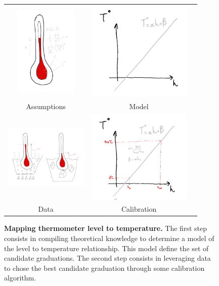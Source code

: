 \begin{bibunit}
\begin{figure}[h]
\begin{tabular}{ccc}
    \includegraphics[clip, width=3cm, width=3cm]{Introduction/pics/therm_theroy.png} &   \includegraphics[clip, width=5cm]{Introduction/pics/therm_model.png}  &   \\   Assumptions & Model&\\ 
     \includegraphics[clip, width=4cm, height=4cm, trim={2cm 1cm 2cm 2cm}]{Introduction/pics/therm_obs.png} &    \includegraphics[clip, width=5cm]{Introduction/pics/therm_calib.png}   &  \\    Data & Calibration&\\
\end{tabular}

    \caption{\textbf{Mapping thermometer level to temperature.} The first step consists in compiling theoretical knowledge to determine a model of the level to temperature relationship. This model define the set of candidate graduations. The second step consists in leveraging data to chose the best candidate graduation through some calibration algorithm.}
    \label{fig:therm_mapping}
\end{figure}


\end{bibunit}
